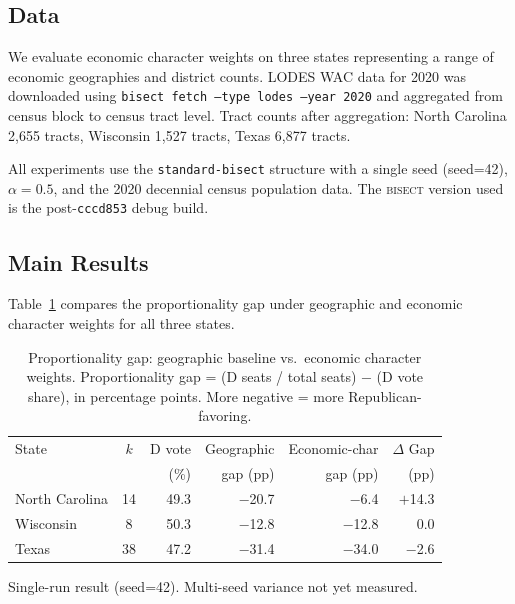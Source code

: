 \label{sec:results}

\subsection{Data}

We evaluate economic character weights on three states representing a range
of economic geographies and district counts.
LODES WAC data for 2020 was downloaded using
\texttt{bisect fetch --type lodes --year 2020} and aggregated from census block
to census tract level.
Tract counts after aggregation:
North Carolina 2,655 tracts,
Wisconsin 1,527 tracts,
Texas 6,877 tracts.

All experiments use the \texttt{standard-bisect} structure with a single seed
(seed=42), $\alpha=0.5$, and the 2020 decennial census population data.
The \textsc{bisect} version used is the post-\texttt{cccd853} debug build.

\subsection{Main Results}

Table~\ref{tab:main-results} compares the proportionality gap under geographic
and economic character weights for all three states.

\begin{table}[ht]
\centering
\begin{threeparttable}
\caption{Proportionality gap: geographic baseline vs.\ economic character weights.
  Proportionality gap = (D seats / total seats) $-$ (D vote share),
  in percentage points. More negative = more Republican-favoring.}
\label{tab:main-results}
\begin{tabular}{lcrrrr}
  \toprule
  State & $k$ & D vote & Geographic & Economic-char & $\Delta$ Gap \\
        &     & (\%)   & gap (pp) & gap (pp) & (pp) \\
  \midrule
  North Carolina & 14 & 49.3 & $-$20.7 & $-$6.4  & $+$14.3 \\
  Wisconsin\tnote{$\dagger$}      &  8 & 50.3 & $-$12.8 & $-$12.8 & 0.0  \\
  Texas\tnote{$\dagger$}          & 38 & 47.2 & $-$31.4 & $-$34.0 & $-$2.6 \\
  \bottomrule
\end{tabular}
\begin{tablenotes}
  \small
  \item[$\dagger$] Single-run result (seed=42). Multi-seed variance not yet measured.
\end{tablenotes}
\end{threeparttable}
\end{table}

